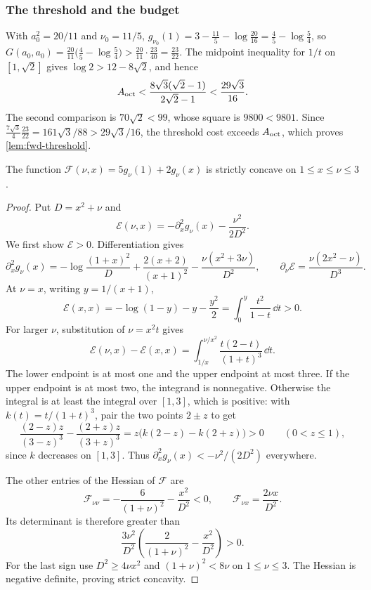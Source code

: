 \subsubsection{The threshold and the budget}\label{app:fwd-budget}

 With $a_0^2=20/11$ and $\nu_0=11/5$,
$g_{\nu_0}(1)=3-\frac{11}5-\log\frac{20}{16}=\frac45-\log\frac54$, so
$G(a_0,a_0)=\frac{20}{11}\bigl(\frac45-\log\frac54\bigr)>\frac{20}{11}\cdot\frac{23}{40}=\frac{23}{22}$.
The midpoint inequality for $1/t$ on $[1,\sqrt2]$ gives $\log2>12-8\sqrt2$, and hence
\[
 A_{\mathrm{oct}}<\frac{8\sqrt3(\sqrt2-1)}{2\sqrt2-1}<\frac{29\sqrt3}{16}.
\]
The second comparison is $70\sqrt2<99$, whose square is $9800<9801$.
Since $\frac{7\sqrt3}{4}\frac{23}{22}=161\sqrt3/88>29\sqrt3/16$, the threshold cost exceeds
$A_{\mathrm{oct}}$, which proves \cref{lem:fwd-threshold}.

\begin{lemma}\label{lem:fwd-joint-concavity}
The function $\mathcal F(\nu,x)=5g_\nu(1)+2g_\nu(x)$ is strictly concave on
$1\le x\le\nu\le3$.
\end{lemma}

\begin{proof}
Put $D=x^2+\nu$ and
\[
 \mathcal E(\nu,x)=-\partial_x^2g_\nu(x)-\frac{\nu^2}{2D^2}.
\]
We first show $\mathcal E>0$. Differentiation gives
\[
 \partial_x^2g_\nu(x)=-\log\frac{(1+x)^2}{D}
  +\frac{2(x+2)}{(x+1)^2}-\frac{\nu(x^2+3\nu)}{D^2},\qquad
 \partial_\nu\mathcal E=\frac{\nu(2x^2-\nu)}{D^3}.
\]
At $\nu=x$, writing $y=1/(x+1)$,
\[
 \mathcal E(x,x)=-\log(1-y)-y-\frac{y^2}{2}
 =\int_0^y\frac{t^2}{1-t}\,\dd t>0.
\]
For larger $\nu$, substitution of $\nu=x^2t$ gives
\[
 \mathcal E(\nu,x)-\mathcal E(x,x)
 =\int_{1/x}^{\nu/x^2}\frac{t(2-t)}{(1+t)^3}\,\dd t.
\]
The lower endpoint is at most one and the upper endpoint at most three. If the upper endpoint
is at most two, the integrand is nonnegative. Otherwise the integral is at least the integral
over $[1,3]$, which is positive: with $k(t)=t/(1+t)^3$, pair the two points $2\pm z$ to get
\[
 \frac{(2-z)z}{(3-z)^3}-\frac{(2+z)z}{(3+z)^3}
 =z\bigl(k(2-z)-k(2+z)\bigr)>0\qquad(0<z\le1),
\]
since $k$ decreases on $[1,3]$. Thus $\partial_x^2g_\nu(x)<-\nu^2/(2D^2)$ everywhere.

The other entries of the Hessian of $\mathcal F$ are
\[
 \mathcal F_{\nu\nu}=-\frac6{(1+\nu)^2}-\frac{x^2}{D^2}<0,\qquad
 \mathcal F_{\nu x}=\frac{2\nu x}{D^2}.
\]
Its determinant is therefore greater than
\[
 \frac{3\nu^2}{D^2}
 \left(\frac2{(1+\nu)^2}-\frac{x^2}{D^2}\right)>0.
\]
For the last sign use $D^2\ge4\nu x^2$ and $(1+\nu)^2<8\nu$ on $1\le\nu\le3$.
The Hessian is negative definite, proving strict concavity.
\end{proof}

